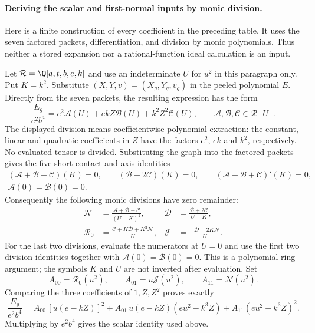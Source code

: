 \paragraph{Deriving the scalar and first-normal inputs by monic division.}
Here is a finite construction of every coefficient in the preceding table. It uses the seven factored packets, differentiation, and division by monic polynomials. Thus neither a stored expansion nor a rational-function ideal calculation is an input.

Let $\mathcal R=\Q[a,t,b,e,k]$ and use an indeterminate $U$ for $u^2$ in this paragraph only. Put $K=k^2$. Substitute $(X,Y,v)=(X_g,Y_g,v_g)$ in the peeled polynomial $E$. Directly from the seven packets, the resulting expression has the form
\[
\frac{E_g}{e^2b^4}=e^2\mathcal A(U)+ekZ\mathcal B(U)+k^2Z^2\mathcal C(U),
\qquad \mathcal A,\mathcal B,\mathcal C\in\mathcal R[U].
\]
The displayed division means coefficientwise polynomial extraction: the constant, linear and quadratic coefficients in $Z$ have the factors $e^2$, $ek$ and $k^2$, respectively. No evaluated tensor is divided. Substituting the graph into the factored packets gives the five short contact and axis identities
\begin{gather*}
(\mathcal A+\mathcal B+\mathcal C)(K)=0,\qquad
(\mathcal B+2\mathcal C)(K)=0,\qquad
(\mathcal A+\mathcal B+\mathcal C)'(K)=0,\\
\mathcal A(0)=\mathcal B(0)=0.
\end{gather*}
Consequently the following monic divisions have zero remainder:
\begin{align*}
\mathcal N&=\frac{\mathcal A+\mathcal B+\mathcal C}{(U-K)^2},&
\mathcal D&=\frac{\mathcal B+2\mathcal C}{U-K},\\
\mathcal R_0&=\frac{\mathcal C+K\mathcal D+K^2\mathcal N}{U},&
\mathcal J&=\frac{-\mathcal D-2K\mathcal N}{U}.
\end{align*}
For the last two divisions, evaluate the numerators at $U=0$ and use the first two division identities together with $\mathcal A(0)=\mathcal B(0)=0$. This is a polynomial-ring argument; the symbols $K$ and $U$ are not inverted after evaluation. Set
\[
A_{00}=\mathcal R_0(u^2),\qquad A_{01}=u\mathcal J(u^2),
\qquad A_{11}=\mathcal N(u^2).
\]
Comparing the three coefficients of $1,Z,Z^2$ proves exactly
\[
\frac{E_g}{e^2b^4}
=A_{00}\,[u(e-kZ)]^2+A_{01}\,u(e-kZ)(eu^2-k^3Z)
 +A_{11}(eu^2-k^3Z)^2.
\]
Multiplying by $e^2b^4$ gives the scalar identity used above.

